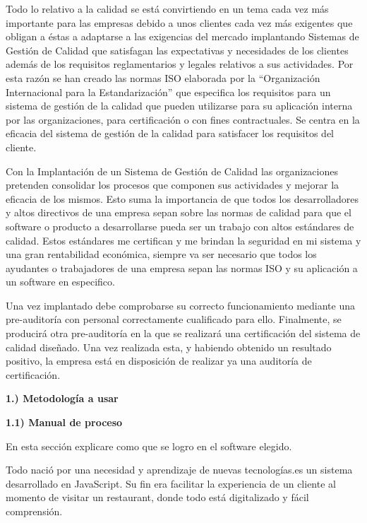 \documentclass{article} %
\begin{document}
\noindent Todo lo relativo a la calidad se est\'{a} convirtiendo en un tema cada vez m\'{a}s importante para las empresas debido a unos clientes cada vez m\'{a}s exigentes que obligan a \'{e}stas a adaptarse a las exigencias del mercado implantando Sistemas de Gesti\'{o}n de Calidad que satisfagan las expectativas y necesidades de los clientes adem\'{a}s de los requisitos reglamentarios y legales relativos a sus actividades. Por esta raz\'{o}n se han creado las normas ISO elaborada por la ``Organizaci\'{o}n Internacional para la Estandarizaci\'{o}n'' que especifica los requisitos para un sistema de gesti\'{o}n de la calidad que pueden utilizarse para su aplicaci\'{o}n interna por las organizaciones, para certificaci\'{o}n o con fines contractuales. Se centra en la eficacia del sistema de gesti\'{o}n de la calidad para satisfacer los requisitos del cliente.

\noindent Con la Implantaci\'{o}n de un Sistema de Gesti\'{o}n de Calidad las organizaciones pretenden consolidar los procesos que componen sus actividades y mejorar la eficacia de los mismos. Esto suma la importancia de que todos los desarrolladores y altos directivos de una empresa sepan sobre las normas de calidad para que el software o producto a desarrollarse pueda ser un trabajo con altos est\'{a}ndares de calidad. Estos est\'{a}ndares me certifican y me brindan la seguridad en mi sistema y una gran rentabilidad econ\'{o}mica, siempre va ser necesario que todos los ayudantes o trabajadores de una empresa sepan las normas ISO y su aplicaci\'{o}n a un software en especifico.

\noindent Una vez implantado debe comprobarse su correcto funcionamiento mediante una pre-auditor\'{i}a con personal correctamente cualificado para ello. Finalmente, se producir\'{a} otra pre-auditor\'{i}a en la que se realizar\'{a} una certificaci\'{o}n del sistema de calidad dise\~{n}ado. Una vez realizada esta, y habiendo obtenido un resultado positivo, la empresa est\'{a} en disposici\'{o}n de realizar ya una auditor\'{i}a de certificaci\'{o}n.

\noindent \textbf{}

\noindent \textbf{1.) Metodolog\'{i}a a usar}

\noindent \textbf{        1.1) Manual de proceso}

\noindent En esta secci\'{o}n explicare como que se logro en el software elegido.

\noindent Todo naci\'{o} por una necesidad y aprendizaje de nuevas tecnolog\'{i}as.es un sistema desarrollado en JavaScript. Su fin era facilitar la experiencia   de un cliente al momento de visitar un restaurant, donde todo est\'{a} digitalizado y f\'{a}cil comprensi\'{o}n.
\end{document}
